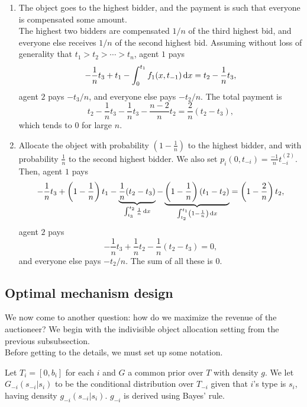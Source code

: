 		\begin{fex}
			\phantom{pain}
			\begin{enumerate}
				\item The object goes to the highest bidder, and the payment is such that everyone is compensated some amount.\\
				The highest two bidders are compensated $1/n$ of the third highest bid, and everyone else receives $1/n$ of the second highest bid. Assuming without loss of generality that $t_1 > t_2 > \cdots > t_n$, agent $1$ pays
				\[ -\frac{1}{n}t_3 + t_1 - \int_0^{t_1} f_1(x,t_{-1}) \dif x = t_2 - \frac{1}{n} t_3, \]
				agent $2$ pays $-t_3/n$, and everyone else pays $-t_2/n$. The total payment is
				\[ t_2 - \frac{1}{n}t_3 - \frac{1}{n}t_3 - \frac{n-2}{n} t_2 = \frac{2}{n}(t_2 - t_3), \]
				which tends to $0$ for large $n$.

				\item Allocate the object with probability $\left(1 - \frac{1}{n}\right)$ to the highest bidder, and with probability $\frac{1}{n}$ to the second highest bidder. We also set $p_i(0,t_{-i}) = \frac{-1}{n} t_{-i}^{(2)}$. Then, agent $1$ pays
				\[ -\frac{1}{n}t_3 + \left( 1 - \frac{1}{n} \right)t_1 - \underbrace{\frac{1}{n}(t_2-t_3)}_{\int_{t_3}^{t_2} \frac{1}{n} \dif x } - \underbrace{\left(1 - \frac{1}{n}\right)(t_1-t_2)}_{\int_{t_2}^{t_1} \left(1-\frac{1}{n}\right) \dif x } = \left( 1 - \frac{2}{n} \right)t_2, \]
				agent $2$ pays
				\[ -\frac{1}{n}t_3 + \frac{1}{n}t_2 - \frac{1}{n}(t_2-t_3) = 0, \]
				and everyone else pays $-t_2/n$. The sum of all these is $0$.
			\end{enumerate}
		\end{fex}

	\subsection{Optimal mechanism design}

		We now come to another question: how do we maximize the revenue of the auctioneer? We begin with the indivisible object allocation setting from the previous subsubsection. \\
		Before getting to the details, we must set up some notation.

		Let $T_i = [0,b_i]$ for each $i$ and $G$ a common prior over $T$ with density $g$. We let $G_{-i}(s_{-i} | s_i)$ to be the conditional distribution over $T_{-i}$ given that $i$'s type is $s_i$, having density $g_{-i}(s_{-i}| s_i)$.
		$g_{-i}$ is derived using Bayes' rule.

